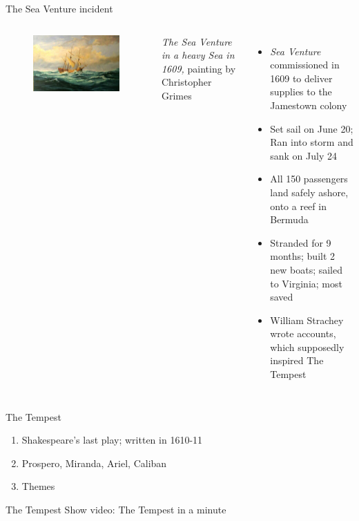 \documentclass{beamer}
\begin{document}
\begin{frame}{The Sea Venture incident}
  \begin{columns}[c]
    \begin{figure}[htp]
      \begin{center}
        \centering
        \includegraphics[scale=0.29]{seaventure.jpg}
      \end{center}
    \end{figure}
    \footnotesize{\emph{The Sea Venture in a heavy Sea in 1609,} painting by Christopher Grimes}

  \begin{itemize}
  \item \emph{Sea Venture} commissioned in 1609 to deliver supplies to the Jamestown colony
  \item Set sail on June 20; Ran into storm and sank on July 24
  \item All 150 passengers land safely ashore, onto a reef in Bermuda
  \item Stranded for 9 months; built 2 new boats; sailed to Virginia; most saved
  \item William Strachey wrote accounts, which supposedly inspired The Tempest
  \end{itemize}
  \end{columns}
\end{frame}

\begin{frame}{The Tempest}
  \begin{enumerate}
    \item Shakespeare's last play; written in 1610-11
    \item Prospero, Miranda, Ariel, Caliban
    \item Themes
  \end{enumerate}
\end{frame}

\begin{frame}{The Tempest}
  Show video: The Tempest in a minute
\end{frame}
\end{document}
